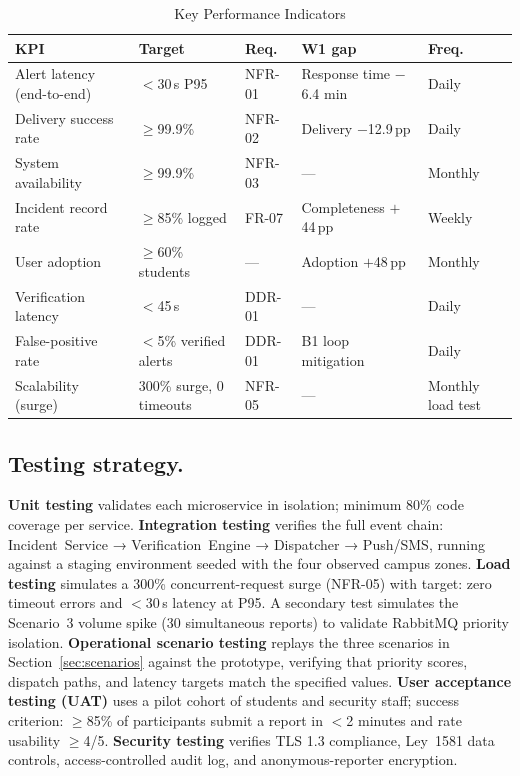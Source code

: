 \documentclass[12pt,a4paper]{article}
\begin{document}
\begin{table}[h]
\caption{Key Performance Indicators}
\label{tab:kpi}
\centering
\begin{tabularx}{\textwidth}{lllXl}
\toprule
\textbf{KPI} & \textbf{Target} & \textbf{Req.} & \textbf{W1 gap} & \textbf{Freq.} \\
\midrule
Alert latency (end-to-end) & $<$30\,s P95 & NFR-01 & Response time $-$6.4 min & Daily \\
Delivery success rate & $\geq$99.9\% & NFR-02 & Delivery $-$12.9\,pp & Daily \\
System availability & $\geq$99.9\% & NFR-03 & --- & Monthly \\
Incident record rate & $\geq$85\% logged & FR-07 & Completeness $+$44\,pp & Weekly \\
User adoption & $\geq$60\% students & --- & Adoption $+$48\,pp & Monthly \\
Verification latency & $<$45\,s & DDR-01 & --- & Daily \\
False-positive rate & $<$5\% verified alerts & DDR-01 & B1 loop mitigation & Daily \\
Scalability (surge) & 300\% surge, 0 timeouts & NFR-05 & --- & Monthly load test \\
\bottomrule
\end{tabularx}
\end{table}

\subsection{Testing strategy.}
\textbf{Unit testing} validates each microservice in isolation;
minimum 80\% code coverage per service.
\textbf{Integration testing} verifies the full event chain:
Incident~Service → Verification~Engine → Dispatcher → Push/SMS,
running against a staging environment seeded with the four observed
campus zones.
\textbf{Load testing} simulates a 300\% concurrent-request surge
(NFR-05) with target: zero timeout errors and $<$30\,s latency at P95.
A secondary test simulates the Scenario~3 volume spike (30
simultaneous reports) to validate RabbitMQ priority isolation.
\textbf{Operational scenario testing} replays the three scenarios in
Section~\ref{sec:scenarios} against the prototype, verifying that
priority scores, dispatch paths, and latency targets match the
specified values.
\textbf{User acceptance testing (UAT)} uses a pilot cohort of students
and security staff; success criterion: $\geq$85\% of participants
submit a report in $<$2 minutes and rate usability $\geq$4/5.
\textbf{Security testing} verifies TLS 1.3 compliance, Ley~1581
data controls, access-controlled audit log, and anonymous-reporter
encryption.
\end{document}
